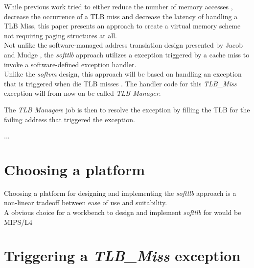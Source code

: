 
While previous work tried to either reduce the number of memory accesses ,
decrease the occurrence of a TLB miss and decrease the latency of handling a TLB Miss, this paper
presents an approach to create a virtual memory scheme not requiring paging structures at all.\\

Not unlike the software-managed address translation design presented by Jacob and Mudge \cite{jacobSoftwaremanagedAddressTranslation1997},
the \textit{softtlb} approach utilizes a exception triggered by a cache miss to invoke a software-defined
exception handler.\\
Unlike the \textit{softvm} design, this approach will be based on handling an exception that is triggered
when die TLB misses .
The handler code for this \textit{TLB\_Miss} exception will from now on be called \textit{TLB Manager}.

The \textit{TLB Manager}s job is then to resolve the exception by filling the TLB for the failing address
that triggered the exception.

...

\section{Choosing a platform}
Choosing a platform for designing and implementing the \textit{softtlb} approach is a non-linear tradeoff between
ease of use and suitability.\\
A obvious choice for a workbench to design and implement \textit{softtlb} for would be MIPS/L4 \cite{heiserAnatomyHighPerformanceMicrokernel}


\section{Triggering a \textit{TLB\_Miss} exception}


